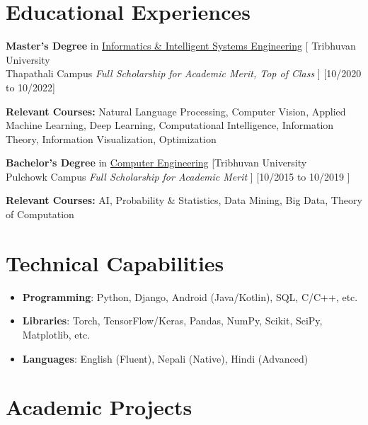 \documentclass{resumex}
\begin{document}
\section{Educational Experiences}
\ResumeItem
{\textbf{Master's Degree} 
 in \href{https://tcioe.edu.np/page/MSIISE}{Informatics \& Intelligent Systems Engineering}}
[  Tribhuvan University \\
Thapathali Campus \qquad \textit{Full Scholarship for Academic Merit, Top of Class}
]
[10/2020 to 10/2022]

\textbf{Relevant Courses:} Natural Language Processing, Computer Vision, Applied Machine Learning, Deep Learning, Computational Intelligence, Information Theory, Information Visualization, Optimization 

\ResumeItem
{\textbf{ Bachelor's Degree}  in \href{ http://doece.pcampus.edu.np/index.php/bachelor-in-computer-engineering}{Computer Engineering}}
[Tribhuvan University\\
Pulchowk Campus \qquad  \textit{Full Scholarship for Academic Merit}
]
[10/2015 to 10/2019 ]

\textbf{Relevant Courses:} AI, Probability \& Statistics, Data Mining, Big Data, Theory of Computation 



\section[Technical Capabilities]{Technical Capabilities\protect}
\begin{itemize}
   \item \textbf{Programming}: Python, Django, Android (Java/Kotlin), SQL, C/C++, etc.
   \item \textbf{Libraries}: Torch, TensorFlow/Keras, Pandas, NumPy, Scikit, SciPy, Matplotlib, etc.
   \item \textbf{Languages}:
   English (Fluent), Nepali (Native), Hindi (Advanced)
\end{itemize}

\section{Academic Projects}
\end{document}
